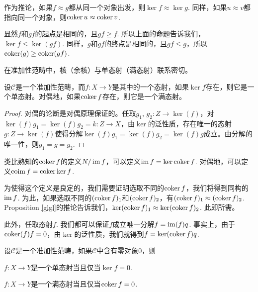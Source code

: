 作为推论，如果$f\approx g$都从同一个对象出发，则$\ker f\approx \ker g$. 同样，如果$u\approx v$都指向同一个对象，则$\operatorname{coker} u \approx \operatorname{coker} v$.

\begin{para}[复合态射的核与余核]
显然$f$和$gf$的起点是相同的，且$gf\geq f$. 所以上面的命题告诉我们，$\ker f \leq \ker (gf)$. 同样，$g$和$gf$的终点是相同的，且$gf\leq g$，所以$\operatorname{coker}(g) \geq \operatorname{coker}(gf)$.
\end{para}

在准加性范畴中，核（余核）与单态射（满态射）联系密切。

\begin{lem}
设$\mathcal{C}$是一个准加性范畴，而$f:X\to Y$是其中的一个态射，如果$\ker f$存在，则它是一个单态射。对偶地，如果$\operatorname{coker} f$存在，则它是一个满态射。
\end{lem}

\begin{proof}
对偶的论断是对偶原理保证的。任取$g_1$, $g_2:Z\to \ker(f)$，对$\ker (f) g_1=\ker (f) g_2=k:Z\to X$，由$\ker$的泛性质，存在唯一的态射$g:Z\to \ker(f)$使得分解$\ker (f) g_1=\ker (f) g_2=\ker (f) g$成立。由分解的唯一性，则$g_1=g=g_2$.
\end{proof}



\begin{para}
类比熟知的$\operatorname{coker} f$的定义$N/\operatorname{im} f$，可以定义$\operatorname{im} f=\ker \operatorname{coker} f$. 对偶地，可以定义$\operatorname{coim} f=\operatorname{coker} \ker f$.
\end{para}

为使得这个定义是良定的，我们需要证明选取不同的$\operatorname{coker} f$，我们将得到同构的$\operatorname{im} f$. 为此，如果选取不同的$(\operatorname{coker} f)_1$和$(\operatorname{coker} f)_2$，有$(\operatorname{coker} f)_1\approx (\operatorname{coker} f)_2$. Proposition \ref{glgl}的推论告诉我们，$\ker (\operatorname{coker} f)_1\approx \ker (\operatorname{coker} f)_2$. 此即所需。

此外，任取态射$f$. 我们都可以保证$f$成立唯一分解$f=\operatorname{im}(f)q$. 事实上，由于$\operatorname{coker}(f)f=0$，由$\ker$的泛性质，我们就得到$f=\ker(\operatorname{coker} f)q$.

\begin{pro}
设$\mathcal{C}$是一个准加性范畴，如果$\mathcal{C}$中含有零对象$0$，则
\begin{compactenum}[~~~(1)]
\item $f:X\to Y$是一个单态射当且仅当$\ker f=0$.
\item $f:X\to Y$是一个满态射当且仅当$\operatorname{coker} f=0$.
\end{compactenum}
\end{pro}

